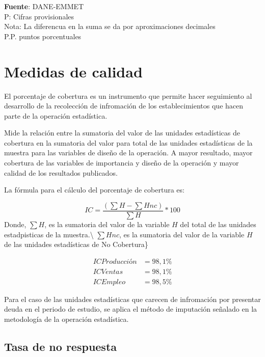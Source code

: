 \documentclass[
]{article}
\begin{document}
\textbf{Fuente}: DANE-EMMET\\
P: Cifras provisionales\\
Nota: La diferencua en la suma se da por aproximaciones decimales\\
P.P. puntos porcentuales

\hypertarget{medidas-de-calidad}{%
\section{Medidas de calidad}\label{medidas-de-calidad}}

El porcentaje de cobertura es un instrumento que permite hacer
seguimiento al desarrollo de la recolección de infromación de los
establecimientos que hacen parte de la operación estadística.

Mide la relación entre la sumatoria del valor de las unidades
estadísticas de cobertura en la sumatoria del valor para total de las
unidades estadísticas de la muestra para las variables de diseño de la
operación. A mayor resultado, mayor cobertura de las variables de
importancia y diseño de la operación y mayor calidad de los resultados
publicados.

La fórmula para el cálculo del porcentaje de cobertura es:

\begin{equation*}
IC = \frac{(\sum H - \sum Hnc)}{\sum H}*100
\end{equation*} Donde, \(\sum H\), es la sumatoria del valor de la
variable \(H\) del total de las unidades estadpisticas de la
muestra.\textbackslash{} \(\sum Hnc\), es la sumatoria del valor de la
variable \(H\) de las unidades estadísticas de No Cobertura\}

\begin{align*}
ICProducción &= 98,1\%\\
ICVentas &= 98,1\%\\
ICEmpleo &= 98,5\%
\end{align*}

Para el caso de las unidades estadísticas que carecen de infromación por
presentar deuda en el periodo de estudio, se aplica el método de
imputación señalado en la metodología de la operación estadística.

\hypertarget{tasa-de-no-respuesta}{%
\subsection{Tasa de no respuesta}\label{tasa-de-no-respuesta}}
\end{document}
